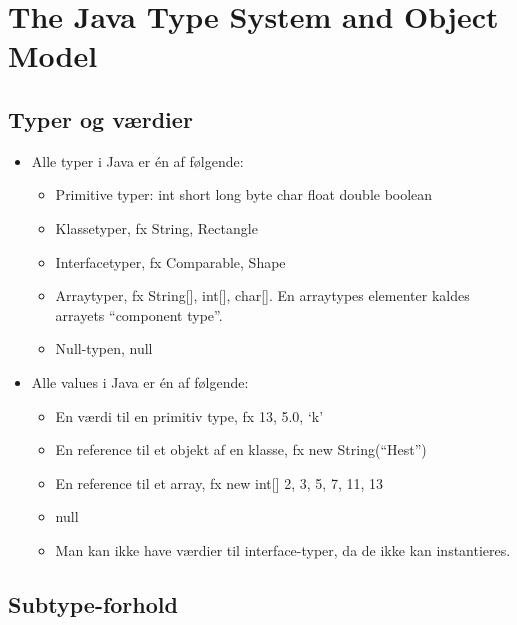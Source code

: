 \section{The Java Type System and Object Model}

\subsection{Typer og værdier}

\begin{itemize}
  \item Alle typer i Java er én af følgende:
  \begin{itemize}
    \item Primitive typer: int short long byte char float double boolean
    \item Klassetyper, fx String, Rectangle
    \item Interfacetyper, fx Comparable, Shape
    \item Arraytyper, fx String[], int[], char[]. En arraytypes elementer kaldes arrayets “component type”.
    \item Null-typen, null
  \end{itemize}

  \item Alle values i Java er én af følgende:
  \begin{itemize}
    \item En værdi til en primitiv type, fx 13, 5.0, ‘k’
    \item En reference til et objekt af en klasse, fx new String(“Hest”)
    \item En reference til et array, fx new int[] {2, 3, 5, 7, 11, 13}
    \item null
    \item Man kan ikke have værdier til interface-typer, da de ikke kan instantieres.
  \end{itemize}
\end{itemize}

\subsection{Subtype-forhold}

